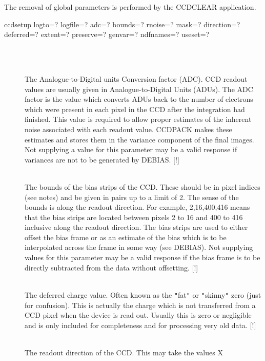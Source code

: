 \documentclass[twoside,11pt]{article}
\newcommand{\htmlref}[2]{#1}
\newcommand{\xlabel}[1]{}
\renewcommand{\_}{\texttt{\symbol{95}}}
\newcommand{\qt}[1]{{\tt "}#1{\tt "}}
\newcommand{\xroutine}[1]{\htmlref{{\sc #1}}{#1}}
\newcommand{\sstusage}[1]{\item[Usage:] \mbox{}
   \begin{description}
      {\ssttt \item #1}
   \end{description}
}
\newcommand{\sstparameters}[1]{
   \item[Parameters:] \mbox{} \\
   \vspace{-3.5ex}
   \begin{description}
      #1
   \end{description}
}
\newcommand{\sstsubsection}[1]{ \item[{#1}] \mbox{} \\}
\newcommand{\sstusage}[1]{\item[Usage:]
      \begin{description}
         {\ssttt #1}
      \end{description}
      \\
   }
\newcommand{\sstparameters}[1]{
      \item[Parameters:] \\
      \begin{description}
         #1
      \end{description}
      \\
   }
\newcommand{\sstsubsection}[1]{\item[{#1}]}
\begin{document}
{{      The removal of global parameters is performed by the \xroutine{CCDCLEAR}
      application.
   }
   \sstusage{
      ccdsetup logto=? logfile=? adc=? bounds=? rnoise=? mask=?
               direction=? deferred=? extent=? preserve=? genvar=?
               ndfnames=? useset=?
   }
   \sstparameters{
      \sstsubsection{
         \xlabel{CCDADC}
         ADC = \_DOUBLE (Read and Write)
      } {
         The Analogue-to-Digital units Conversion factor (ADC). CCD
         readout values are usually given in Analogue-to-Digital Units
         (ADUs). The ADC factor is the value which converts ADUs back
         to the number of electrons which were present in each pixel in
         the CCD after the integration had finished. This value is
         required to allow proper estimates of the inherent noise
         associated with each readout value. CCDPACK makes these
         estimates and stores them in the variance component of the
         final images. Not supplying a value for this parameter may be a
         valid response if variances are not to be generated by \xroutine{DEBIAS}.
         [!]
      }
      \sstsubsection{
         \xlabel{CCDbounds}
         BOUNDS( 2 or 4 ) = \_INTEGER (Read and Write)
      } {
         The bounds of the bias strips of the CCD. These should be in
         pixel indices (see notes) and be given in pairs up to a limit
         of 2. The sense of the bounds is along the readout direction.
         For example, 2,16,400,416 means that the bias strips are
         located between pixels 2 to 16 and 400 to 416 inclusive along
         the readout direction. The bias strips are used to either
         offset the bias frame or as an estimate of the bias which is to
         be interpolated across the frame in some way (see \xroutine{DEBIAS}). Not
         supplying values for this parameter may be a valid response if
         the bias frame is to be directly subtracted from the data
         without offsetting.
         [!]
      }
      \sstsubsection{
         \xlabel{CCDdeferred}
         DEFERRED = \_DOUBLE (Read and Write)
      } {
         The deferred charge value. Often known as the \qt{fat} or \qt{skinny}
         zero (just for confusion). This is actually the charge which is
         not transferred from a CCD pixel when the device is read out.
         Usually this is zero or negligible and is only included for
         completeness and for processing very old data.
         [!]
      }
      \sstsubsection{
         \xlabel{CCDdirection}
         DIRECTION = LITERAL (Read and Write)
      } {
         The readout direction of the CCD. This may take the values X
}}}
\end{document}
